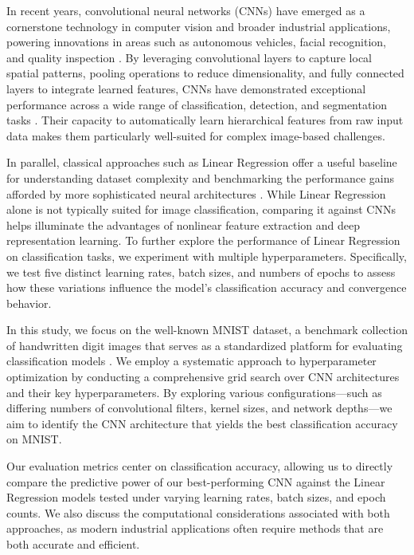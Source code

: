 In recent years, convolutional neural networks (CNNs) have emerged as a cornerstone technology in computer vision and broader industrial applications, powering innovations in areas such as autonomous vehicles, facial recognition, and quality inspection \cite{lecun2015deep, krizhevsky2012imagenet}. By leveraging convolutional layers to capture local spatial patterns, pooling operations to reduce dimensionality, and fully connected layers to integrate learned features, CNNs have demonstrated exceptional performance across a wide range of classification, detection, and segmentation tasks \cite{he2016deep}. Their capacity to automatically learn hierarchical features from raw input data makes them particularly well-suited for complex image-based challenges.

In parallel, classical approaches such as Linear Regression offer a useful baseline for understanding dataset complexity and benchmarking the performance gains afforded by more sophisticated neural architectures \cite{hastie2009elements}. While Linear Regression alone is not typically suited for image classification, comparing it against CNNs helps illuminate the advantages of nonlinear feature extraction and deep representation learning. To further explore the performance of Linear Regression on classification tasks, we experiment with multiple hyperparameters. Specifically, we test five distinct learning rates, batch sizes, and numbers of epochs to assess how these variations influence the model's classification accuracy and convergence behavior.

In this study, we focus on the well-known MNIST dataset, a benchmark collection of handwritten digit images that serves as a standardized platform for evaluating classification models \cite{lecun1998gradient}. We employ a systematic approach to hyperparameter optimization by conducting a comprehensive grid search over CNN architectures and their key hyperparameters. By exploring various configurations—such as differing numbers of convolutional filters, kernel sizes, and network depths—we aim to identify the CNN architecture that yields the best classification accuracy on MNIST.

Our evaluation metrics center on classification accuracy, allowing us to directly compare the predictive power of our best-performing CNN against the Linear Regression models tested under varying learning rates, batch sizes, and epoch counts. We also discuss the computational considerations associated with both approaches, as modern industrial applications often require methods that are both accurate and efficient.


